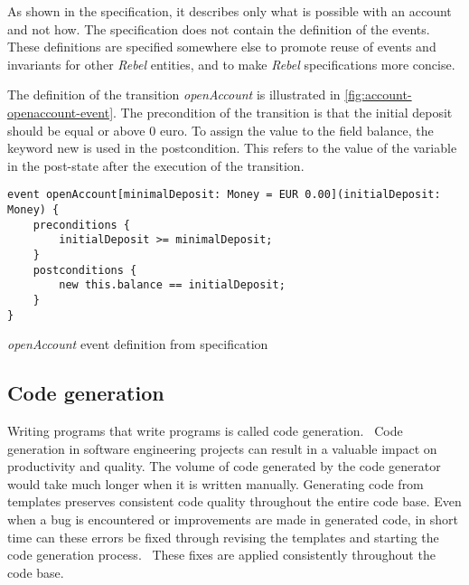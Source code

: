 As shown in the specification, it describes only what is possible with an
account and not how. The specification does not contain the definition of the
events. These definitions are specified somewhere else to promote reuse of
events and invariants for other \textit{Rebel} entities, and to make
\textit{Rebel} specifications more concise.~\cite[p.~4]{stoel_storm_vinju_bosman_2016}

The definition of the transition \textit{openAccount} is illustrated in
\autoref{fig:account-openaccount-event}. The precondition of the transition is
that the initial deposit should be equal or above 0 euro. To assign the value
to the field balance, the keyword new is used in the postcondition. This refers
to the value of the variable in the post-state after the execution of the
transition.~\cite[p.~4]{stoel_storm_vinju_bosman_2016}

\begin{sourcecode}[h!]
\begin{lstlisting}[]
event openAccount[minimalDeposit: Money = EUR 0.00](initialDeposit: Money) {
	preconditions {
		initialDeposit >= minimalDeposit;
	}
	postconditions {
		new this.balance == initialDeposit;
	}
}
\end{lstlisting}
\caption{\textit{openAccount} event definition from specification}\label{fig:account-openaccount-event}
\end{sourcecode}
\FloatBarrier

\subsection{Code generation}\label{sec:ch2-codegen}

Writing programs that write programs is called code
generation.~\cite[p.~3]{herrington2003code} Code generation in software
engineering projects can result in a valuable impact on productivity and
quality. The volume of code generated by the code generator would take much
longer when it is written manually. Generating code from templates preserves
consistent code quality throughout the entire code base. Even when a bug is
encountered or improvements are made in generated code, in short time can these
errors be fixed through revising the templates and starting the code generation
process.~\cite[p.~15-17]{herrington2003code} These fixes are applied
consistently throughout the code base.


